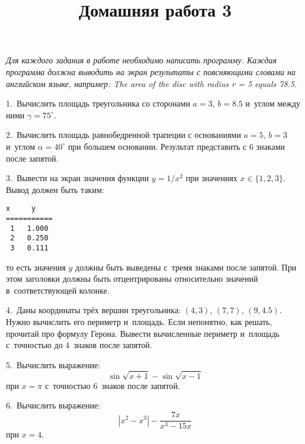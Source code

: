 \documentclass[12pt,russian,draft]{article}
\title{Домашняя работа 3}
\date{}
\begin{document}
\maketitle{}

\emph{Для каждого задания в работе необходимо написать программу. Каждая
    программа должна выводить на экран результаты с поясняющими словами на
    английском языке, например: The area of the disc with radius r = 5 equals
    78.5.}

1.\ Вычислить площадь треугольника со сторонами $ a = 3 $, $ b = 8.5 $ и~углом
между ними $ \gamma = 75^{\circ} $.

2.\ Вычислить площадь равнобедренной трапеции с основаниями $ a = 5 $, $ b = 3
$ и~углом $ \alpha = 40^{\circ} $ при большем основании. Результат представить
с 6 знаками после запятой.

3.\ Вывести на экран значения функции $ y = 1 / x^2 $ при значениях $ x \in 
\{1, 2, 3\} $. Вывод должен быть таким:
\begin{Verbatim}[fontfamily=tt]
 x     y   
===========
 1   1.000 
 2   0.250 
 3   0.111 
\end{Verbatim}
то есть значения $ y $ должны быть выведены с~тремя знаками после запятой. При
этом заголовки должны быть отцентрированы относительно значений 
в~соответствующей колонке.

4.\ Даны координаты трёх вершин треугольника: $ (4, 3) $, $ (7, 7) $, $ (9,
4.5) $. Нужно вычислить его пери\-метр и~площадь. Если непонятно, как решать,
прочитай про формулу Герона. Вывес\-ти вы\-чис\-лен\-ные периметр и~площадь
с~точностью до 4~знаков после запятой.

5.\ Вычислить выражение:
\[
    \sin{\sqrt{x + 1}} - \sin{\sqrt{x - 1}}
\]
при $ x = \pi $ с~точностью 6~знаков после запятой.

6.\ Вычислить выражение:
\[
    |x^2 - x^3| - \frac{7x}{x^3-15x}
\]
при $ x = 4 $.
\end{document}
